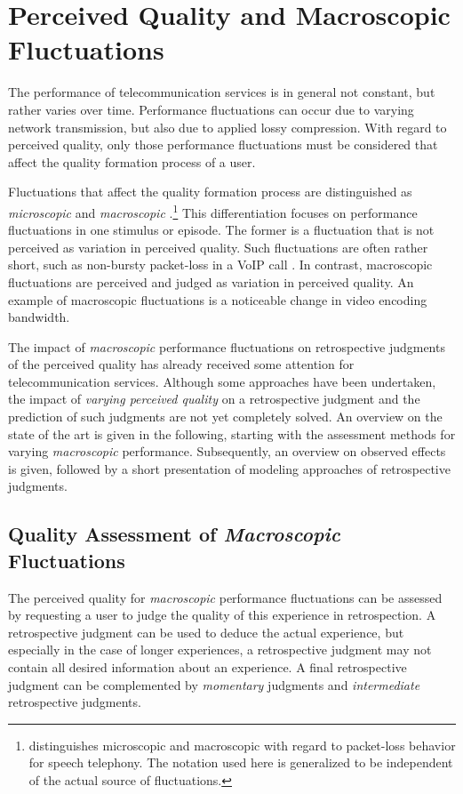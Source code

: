 \section{Perceived Quality and Macroscopic Fluctuations}\label{chap:04}
The performance of telecommunication services is in general not constant, but rather varies over time.
Performance fluctuations can occur due to varying network transmission, but also due to applied lossy compression.
With regard to perceived quality, only those performance fluctuations must be considered that affect the quality formation process of a user.

Fluctuations that affect the quality formation process are distinguished as \emph{microscopic} and \emph{macroscopic} \citep[][p.\,72]{raake_short-_2006}.\footnote{\citet{raake_short-_2006} distinguishes microscopic and macroscopic with regard to packet-loss behavior for speech telephony. The notation used here is generalized to be independent of the actual source of fluctuations.}
This differentiation focuses on performance fluctuations in one stimulus or episode.
The former is a fluctuation that is not perceived as variation in perceived quality.
Such fluctuations are often rather short, such as non-bursty packet-loss in a \ac{VoIP} call \citep[\cf,][p.\,72]{raake_short-_2006}.
In contrast, macroscopic fluctuations are perceived and judged as variation in perceived quality.
An example of macroscopic fluctuations is a noticeable change in video encoding bandwidth.

The impact of \emph{macroscopic} performance fluctuations on retrospective judgments of the perceived quality has already received some attention for telecommunication services.
Although some approaches have been undertaken, the impact of \emph{varying perceived quality} on a retrospective judgment and the prediction of such judgments are not yet completely solved.
An overview on the state of the art is given in the following, starting with the assessment methods for varying \emph{macroscopic} performance.
Subsequently, an overview on observed effects is given, followed by a short presentation of modeling approaches of retrospective judgments.

\subsection{Quality Assessment of \emph{Macroscopic} Fluctuations}
The perceived quality for \emph{macroscopic} performance fluctuations can be assessed by requesting a user to judge the quality of this experience in retrospection.
A retrospective judgment can be used to deduce the actual experience, but especially in the case of longer experiences, a retrospective judgment may not contain all desired information about an experience.
A final retrospective judgment can be complemented by \emph{momentary} judgments and \emph{intermediate} retrospective judgments.

